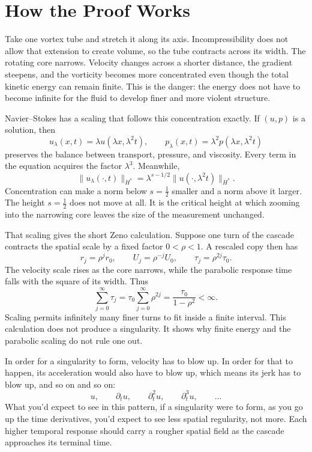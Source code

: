 \section*{How the Proof Works}

Take one vortex tube and stretch it along its axis. Incompressibility does not
allow that extension to create volume, so the tube contracts across its width.
The rotating core narrows. Velocity changes across a shorter distance, the
gradient steepens, and the vorticity becomes more concentrated even though the
total kinetic energy can remain finite. This is the danger: the energy does not
have to become infinite for the fluid to develop finer and more violent
structure.

Navier--Stokes has a scaling that follows this concentration exactly. If
\((u,p)\) is a solution, then
\[
u_\lambda(x,t)=\lambda u(\lambda x,\lambda^2t),
\qquad
p_\lambda(x,t)=\lambda^2p(\lambda x,\lambda^2t)
\]
preserves the balance between transport, pressure, and viscosity. Every term in
the equation acquires the factor \(\lambda^3\). Meanwhile,
\[
\|u_\lambda(\cdot,t)\|_{\dot H^s}
=\lambda^{s-1/2}
  \|u(\cdot,\lambda^2t)\|_{\dot H^s}.
\]
Concentration can make a norm below \(s=\tfrac12\) smaller and a norm above it
larger. The height \(s=\tfrac12\) does not move at all. It is the critical
height at which zooming into the narrowing core leaves the size of the
measurement unchanged.

That scaling gives the short Zeno calculation. Suppose one turn of the cascade
contracts the spatial scale by a fixed factor \(0<\rho<1\). A rescaled copy then
has
\[
r_j=\rho^j r_0,
\qquad
U_j=\rho^{-j}U_0,
\qquad
\tau_j=\rho^{2j}\tau_0.
\]
The velocity scale rises as the core narrows, while the parabolic response time
falls with the square of its width. Thus
\[
\sum_{j=0}^{\infty}\tau_j
=\tau_0\sum_{j=0}^{\infty}\rho^{2j}
=\frac{\tau_0}{1-\rho^2}<\infty.
\]
Scaling permits infinitely many finer turns to fit inside a finite interval.
This calculation does not produce a singularity. It shows why finite energy
and the parabolic scaling do not rule one out.

In order for a singularity to form, velocity has to blow up. In order for that
to happen, its acceleration would also have to blow up, which means its jerk
has to blow up, and so on and so on:
\[
u,\qquad
\partial_tu,\qquad
\partial_t^2u,\qquad
\partial_t^3u,\qquad\ldots
\]
What you'd expect to see in this pattern, if a singularity were to form, as
you go up the time derivatives, you'd expect to see less spatial regularity,
not more. Each higher temporal response should carry a rougher spatial field
as the cascade approaches its terminal time.

